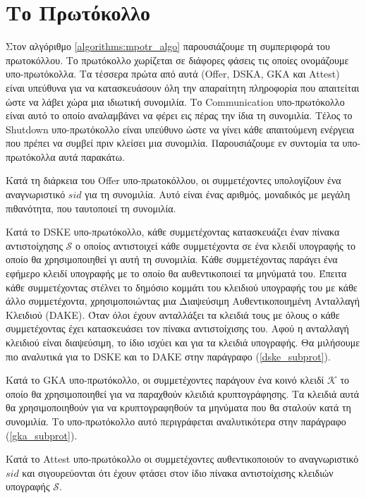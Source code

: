 \section{Το Πρωτόκολλο}

Στον αλγόριθμο \ref{algorithms:mpotr_algo} παρουσιάζουμε τη συμπεριφορά του πρωτοκόλλου.
Το πρωτόκολλο χωρίζεται σε διάφορες φάσεις τις οποίες ονομάζουμε υπο-πρωτόκολλα.
Τα τέσσερα πρώτα από αυτά (Offer, DSKA, GKA και Attest) είναι υπεύθυνα για να κατασκευάσουν όλη την απαραίτητη πληροφορία που απαιτείται ώστε να λάβει χώρα μια ιδιωτική συνομιλία.
Το Communication υπο-πρωτόκολλο είναι αυτό το οποίο αναλαμβάνει να φέρει εις πέρας την ίδια τη συνομιλία.
Τέλος το Shutdown υπο-πρωτόκολλο είναι υπεύθυνο ώστε να γίνει κάθε απαιτούμενη ενέργεια που πρέπει να συμβεί πριν κλείσει μια συνομιλία.
Παρουσιάζουμε εν συντομία τα υπο-πρωτόκολλα αυτά παρακάτω.

Κατά τη διάρκεια του Offer υπο-πρωτοκόλλου, οι συμμετέχοντες υπολογίζουν ένα αναγνωριστικό $sid$ για τη συνομιλία.
Αυτό είναι ένας αριθμός, μοναδικός με μεγάλη πιθανότητα, που ταυτοποιεί τη συνομιλία.

Κατά το DSKE υπο-πρωτόκολλο, κάθε συμμετέχοντας κατασκευάζει έναν πίνακα αντιστοίχησης $\mathcal{S}$ ο οποίος αντιστοιχεί κάθε συμμετέχοντα σε ένα κλειδί υπογραφής το οποίο θα χρησιμοποιηθεί γι αυτή τη συνομιλία.
Κάθε συμμετέχοντας παράγει ένα εφήμερο κλειδί υπογραφής με το οποίο θα αυθεντικοποιεί τα μηνύματά του.
Έπειτα κάθε συμμετέχοντας στέλνει το δημόσιο κομμάτι του κλειδιού υπογραφής του με κάθε άλλο συμμετέχοντα, χρησιμοποιώντας μια Διαψεύσιμη Αυθεντικοποιημένη Ανταλλαγή Κλειδιού (DAKE).
Όταν όλοι έχουν ανταλλάξει τα κλειδιά τους με όλους ο κάθε συμμετέχοντας έχει κατασκευάσει τον πίνακα αντιστοίχισης του.
Αφού η ανταλλαγή κλειδιού είναι διαψεύσιμη, το ίδιο ισχύει και για τα κλειδιά υπογραφής.
Θα μιλήσουμε πιο αναλυτικά για το DSKE και το DAKE στην παράγραφο (\ref{dske_subprot}).

Κατά το GKA υπο-πρωτόκολλο, οι συμμετέχοντες παράγουν ένα κοινό κλειδί $\mathcal{K}$ το οποίο θα χρησιμοποιηθεί για να παραχθούν κλειδιά κρυπτογράφησης.
Τα κλειδιά αυτά θα χρησιμοποιηθούν για να κρυπτογραφηθούν τα μηνύματα που θα σταλούν κατά τη συνομιλία.
Το υπο-πρωτόκολλο αυτό περιγράφεται αναλυτικότερα στην παράγραφο (\ref{gka_subprot}).

Κατά το Attest υπο-πρωτόκολλο οι συμμετέχοντες αυθεντικοποιούν το αναγνωριστικό $sid$ και σιγουρεύονται ότι έχουν φτάσει στον ίδιο πίνακα αντιστοίχισης κλειδιών υπογραφής $\mathcal{S}$.


